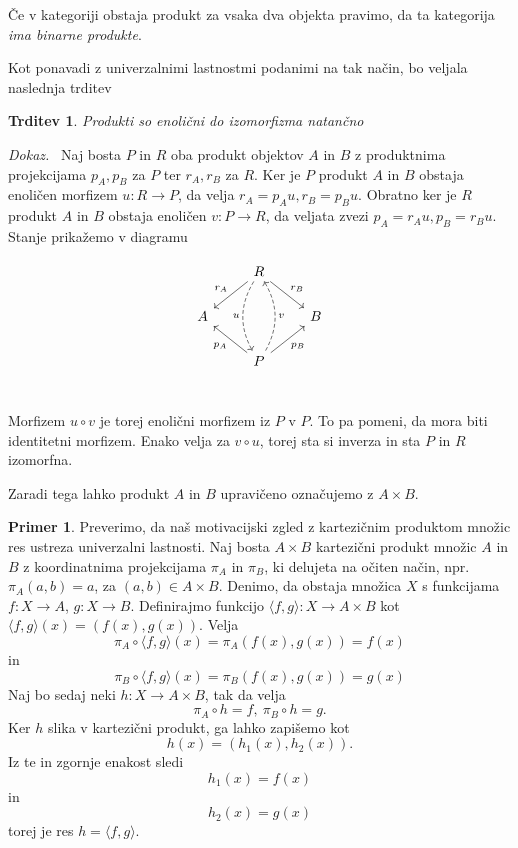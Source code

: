 \documentclass[12pt,a4paper]{book}
\theoremstyle{definition}
\theoremstyle{plain}
\newtheorem{trditev}[definicija]{Trditev}
\newenvironment{dokaz}{\emph{Dokaz.}\ }{\hspace{\fill}{$\Box$}}
\theoremstyle{definition}
\newtheorem{primer}{Primer}[section]
\theoremstyle{remark}
\begin{document}
Če v kategoriji obstaja produkt za vsaka dva objekta pravimo, da ta kategorija \textit{ima binarne produkte}.


Kot ponavadi z univerzalnimi lastnostmi podanimi na tak način, bo veljala naslednja trditev

\begin{trditev}
Produkti so enolični do izomorfizma natančno
\end{trditev}
\begin{dokaz}
Naj bosta $P$ in $R$ oba produkt objektov $A$ in $B$ z produktnima projekcijama $p_A, p_B$ za $P$ ter $r_A, r_B$ za $R$. Ker je $P$ produkt $A$ in $B$ obstaja enoličen morfizem $u : R \to P$, da velja $r_A = p_Au, r_B = p_Bu$. Obratno ker je $R$ produkt $A$ in $B$ obstaja enoličen $v : P \to R$, da veljata zvezi $p_A = r_Au, p_B = r_Bu$. Stanje prikažemo v diagramu

$$\begin{tikzcd}
& R \ar[dd, dashed, bend right, "u"'] \ar[dl, "r_A"'] \ar[dr, "r_B"] & \\
A & & B \\
& P \ar[uu, dashed, bend right, "v"'] \ar[ul, "p_A"] \ar[ur, "p_B"'] & \\
\end{tikzcd}$$

Morfizem $u \circ v $ je torej enolični morfizem iz $P$ v $P$. To pa pomeni, da mora biti identitetni morfizem. Enako velja za $v \circ u$, torej sta si inverza in sta $P$ in $R$ izomorfna.
\end{dokaz}

Zaradi tega lahko produkt $A$ in $B$ upravičeno označujemo z $A \times B$.

\begin{primer}
Preverimo, da naš motivacijski zgled z kartezičnim produktom množic res ustreza univerzalni lastnosti. Naj bosta $A \times B$ kartezični produkt množic $A$ in $B$ z koordinatnima projekcijama $\pi_A$ in $\pi_B$, ki delujeta na očiten način, npr. $\pi_A(a,b) = a$, za $(a,b) \in A \times B$. Denimo, da obstaja množica $X$ s funkcijama $f : X \to A$, $g : X \to B$. Definirajmo funkcijo $\langle f,g \rangle : X \to A \times B$ kot $\langle f,g \rangle(x) = (f(x),g(x))$. Velja 
$$ \pi_A \circ \langle f,g \rangle (x) = \pi_A(f(x),g(x)) = f(x) $$
in 
$$ \pi_B \circ \langle f,g \rangle (x) = \pi_B(f(x),g(x)) = g(x) $$
Naj bo sedaj neki $h : X \to A \times B$, tak da velja
$$\pi_A \circ h = f, \ \pi_B \circ h = g.$$
Ker $h$ slika v kartezični produkt, ga lahko zapišemo kot 
$$h(x) = (h_1(x),h_2(x)).$$
Iz te in zgornje enakost sledi
$$h_1(x) = f(x)$$
in $$h_2(x) = g(x)$$
torej je res $h = \langle f,g \rangle$.
\end{primer}
\end{document}
